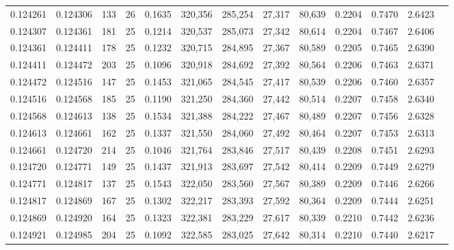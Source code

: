 \begin{tabular}{rrrrrrrrrrrrr}
0.124261 & 0.124306 &   133 &  26 &                                     0.1635 & 320,356 & 285,254 &  27,317 &  80,639 & 0.2204 & 0.7470 & 2.6423 \\
0.124307 & 0.124361 &   181 &  25 &                                     0.1214 & 320,537 & 285,073 &  27,342 &  80,614 & 0.2204 & 0.7467 & 2.6406 \\
0.124361 & 0.124411 &   178 &  25 &                                     0.1232 & 320,715 & 284,895 &  27,367 &  80,589 & 0.2205 & 0.7465 & 2.6390 \\
0.124411 & 0.124472 &   203 &  25 &                                     0.1096 & 320,918 & 284,692 &  27,392 &  80,564 & 0.2206 & 0.7463 & 2.6371 \\
0.124472 & 0.124516 &   147 &  25 &                                     0.1453 & 321,065 & 284,545 &  27,417 &  80,539 & 0.2206 & 0.7460 & 2.6357 \\
0.124516 & 0.124568 &   185 &  25 &                                     0.1190 & 321,250 & 284,360 &  27,442 &  80,514 & 0.2207 & 0.7458 & 2.6340 \\
0.124568 & 0.124613 &   138 &  25 &                                     0.1534 & 321,388 & 284,222 &  27,467 &  80,489 & 0.2207 & 0.7456 & 2.6328 \\
0.124613 & 0.124661 &   162 &  25 &                                     0.1337 & 321,550 & 284,060 &  27,492 &  80,464 & 0.2207 & 0.7453 & 2.6313 \\
0.124661 & 0.124720 &   214 &  25 &                                     0.1046 & 321,764 & 283,846 &  27,517 &  80,439 & 0.2208 & 0.7451 & 2.6293 \\
0.124720 & 0.124771 &   149 &  25 &                                     0.1437 & 321,913 & 283,697 &  27,542 &  80,414 & 0.2209 & 0.7449 & 2.6279 \\
0.124771 & 0.124817 &   137 &  25 &                                     0.1543 & 322,050 & 283,560 &  27,567 &  80,389 & 0.2209 & 0.7446 & 2.6266 \\
0.124817 & 0.124869 &   167 &  25 &                                     0.1302 & 322,217 & 283,393 &  27,592 &  80,364 & 0.2209 & 0.7444 & 2.6251 \\
0.124869 & 0.124920 &   164 &  25 &                                     0.1323 & 322,381 & 283,229 &  27,617 &  80,339 & 0.2210 & 0.7442 & 2.6236 \\
0.124921 & 0.124985 &   204 &  25 &                                     0.1092 & 322,585 & 283,025 &  27,642 &  80,314 & 0.2210 & 0.7440 & 2.6217 \\

\end{tabular}
